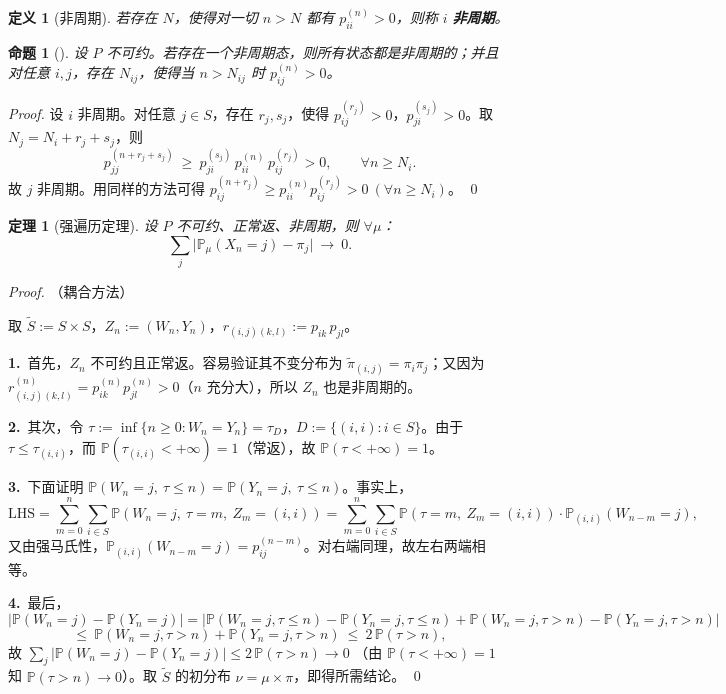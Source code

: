 \documentclass[lang=cn,10pt,newtx,thmcnt=chapter,mode=simple]{vividbook}
\providecommand{\Pp}{}\renewcommand{\Pp}{\mathbb{P}}
\theoremstyle{vividthm}
\newtheorem*{vividtheorem}{定理}
\newtheorem*{vividproposition}{命题}
\theoremstyle{vividdef}
\newtheorem*{vividdefinition}{定义}
\theoremstyle{vividexa}
\theoremstyle{vividrem}
\renewenvironment{theorem}[1][]{\begin{vividtheorem}[#1]}{\end{vividtheorem}}
\renewenvironment{proposition}[1][]{\begin{vividproposition}[#1]}{\end{vividproposition}}
\renewenvironment{definition}[1][]{\begin{vividdefinition}[#1]}{\end{vividdefinition}}
\begin{document}
\begin{definition}[非周期]
若存在 $N$，使得对一切 $n>N$ 都有 $p_{ii}^{(n)}>0$，则称 $i$ \textbf{非周期}。
\end{definition}

\begin{proposition}
设 $P$ 不可约。若存在一个非周期态，则所有状态都是非周期的；并且对任意 $i,j$，存在
$N_{ij}$，使得当 $n>N_{ij}$ 时 $p_{ij}^{(n)}>0$。
\end{proposition}

\begin{proof}
设 $i$ 非周期。对任意 $j\in S$，存在 $r_j,s_j$，使得
$p_{ij}^{(r_j)}>0$，$p_{ji}^{(s_j)}>0$。取 $N_j=N_i+r_j+s_j$，则
\[
p_{jj}^{(n+r_j+s_j)}\ \ge\ p_{ji}^{(s_j)}\,p_{ii}^{(n)}\,p_{ij}^{(r_j)}>0,
\qquad \forall n\ge N_i .
\]
故 $j$ 非周期。用同样的方法可得
$p_{ij}^{(n+r_j)}\ge p_{ii}^{(n)}p_{ij}^{(r_j)}>0\ (\forall n\ge N_i)$。 \qed
\end{proof}

\begin{theorem}[强遍历定理]
设 $P$ 不可约、正常返、非周期，则 $\forall\mu$：
\[
\sum_j\bigl|\Pp_\mu(X_n=j)-\pi_j\bigr|\ \longrightarrow\ 0 .
\]
\end{theorem}

\begin{proof}（耦合方法）

取 $\widetilde{S}:=S\times S$，$Z_n:=(W_n,Y_n)$，$r_{(i,j)(k,l)}:=p_{ik}\,p_{jl}$。

\textbf{1.}\ 首先，$Z_n$ 不可约且正常返。容易验证其不变分布为
$\widetilde{\pi}_{(i,j)}=\pi_i\pi_j$；又因为
$r_{(i,j)(k,l)}^{(n)}=p_{ik}^{(n)}p_{jl}^{(n)}>0$（$n$ 充分大），所以 $Z_n$ 也是非周期的。

\textbf{2.}\ 其次，令 $\tau:=\inf\{n\ge0:W_n=Y_n\}=\tau_D$，$D:=\{(i,i):i\in S\}$。由于
$\tau\le\tau_{(i,i)}$，而 $\Pp(\tau_{(i,i)}<+\infty)=1$（常返），故
$\Pp(\tau<+\infty)=1$。

\textbf{3.}\ 下面证明 $\Pp(W_n=j,\ \tau\le n)=\Pp(Y_n=j,\ \tau\le n)$。事实上，
\[
\text{LHS}=\sum_{m=0}^{n}\sum_{i\in S}\Pp(W_n=j,\ \tau=m,\ Z_m=(i,i))
=\sum_{m=0}^{n}\sum_{i\in S}\Pp(\tau=m,\ Z_m=(i,i))\cdot\Pp_{(i,i)}(W_{n-m}=j),
\]
又由强马氏性，$\Pp_{(i,i)}(W_{n-m}=j)=p_{ij}^{(n-m)}$。对右端同理，故左右两端相等。

\textbf{4.}\ 最后，
\[
\bigl|\Pp(W_n=j)-\Pp(Y_n=j)\bigr|
=\bigl|\Pp(W_n=j,\tau\le n)-\Pp(Y_n=j,\tau\le n)
+\Pp(W_n=j,\tau>n)-\Pp(Y_n=j,\tau>n)\bigr|
\]
\[
\le\ \Pp(W_n=j,\tau>n)+\Pp(Y_n=j,\tau>n)\ \le\ 2\,\Pp(\tau>n),
\]
故 $\sum_j\bigl|\Pp(W_n=j)-\Pp(Y_n=j)\bigr|\le2\,\Pp(\tau>n)\to0$
（由 $\Pp(\tau<+\infty)=1$ 知 $\Pp(\tau>n)\to0$）。取 $\widetilde{S}$ 的初分布
$\nu=\mu\times\pi$，即得所需结论。 \qed
\end{proof}
\end{document}
